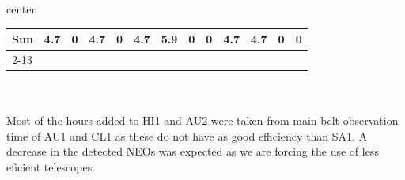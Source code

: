 \documentclass{article}
\begin{document}
\begin{adjustbox}{center}
\begin{tabular}{lcccccccccccc}
		\multicolumn{1}{l|}{{ Sun}}                                       & \multicolumn{1}{c|}{{ 4.7}}                                  & \multicolumn{1}{c|}{{ 0}}                                     & \multicolumn{1}{c|}{{ 4.7}}                                  & \multicolumn{1}{c|}{{ 0}}                                     & \multicolumn{1}{c|}{{ 4.7}}                                  & \multicolumn{1}{c|}{{ 5.9}}                                   & \multicolumn{1}{c|}{{ 0}}                                    & \multicolumn{1}{c|}{{ 0}}                                     & \multicolumn{1}{c|}{{ 4.7}}                                  & \multicolumn{1}{c|}{{ 4.7}}                                   & \multicolumn{1}{c|}{{ 0}}                                    & \multicolumn{1}{c|}{{ 0}}                                     \\ \cline{2-13} 
		\end{tabular}
\end{adjustbox}
\\\\
Most of the hours added to HI1 and AU2 were taken from main belt observation time of AU1 and CL1 as these do not have as good efficiency than SA1.
A decrease in the detected NEOs was expected as we are forcing the use of less eficient telescopes.
\end{document}
